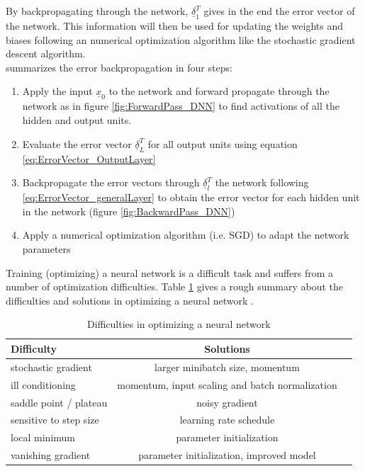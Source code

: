 \documentclass[12pt,DIV14,BCOR12mm,a4paper,footexclude,headinclude,halfparskip-,twoside,openright,cleardoubleempty,idxtotoc,bibtotoc,listtotoc]{scrreprt} %
\numberwithin{equation}{chapter}
\begin{document}
By backpropagating through the network, $\underline{\delta}_{1}^{T}$ gives in the end the error vector of the network. This information will then be used for updating the weights and biases following an numerical optimization algorithm like the stochastic gradient descent algorithm.\\
\cite{Bishop} summarizes the error backpropagation in four steps:
\begin{enumerate}
	\item Apply the input $\underline{x}_{0}$ to the network and forward propagate through the network as in figure \ref{fig:ForwardPass_DNN} to find activations of all the hidden and output units.
	\item Evaluate the error vector $\underline{\delta}_{L}^{T}$ for all output units using equation \ref{eq:ErrorVector_OutputLayer}
	\item Backpropagate the error vectors through $\underline{\delta}_{l}^{T}$ the network following \ref{eq:ErrorVector_generalLayer} to obtain the error vector for each hidden unit in the network (figure \ref{fig:BackwardPass_DNN})
	\item Apply a numerical optimization algorithm (i.e. SGD) to adapt the network parameters
\end{enumerate}
Training (optimizing) a neural network is a difficult task and suffers from a number of optimization difficulties. Table \ref{tab:Difficulties} gives a rough summary about the difficulties and solutions in optimizing a neural network \cite{LectureNotes_DeepLearning}.\\
\begin{table}
    \centering
    \caption{Difficulties in optimizing a neural network}
    \label{tab:Difficulties}
    \begin{tabular}{lcc}
        \toprule
        Difficulty & Solutions\\
        \midrule
        stochastic gradient & larger minibatch size, momentum\\
        ill conditioning & momentum, input scaling and batch normalization\\
        saddle point / plateau & noisy gradient\\
        sensitive to step size & learning rate schedule\\
        local minimum & parameter initialization\\
        vanishing gradient & parameter initialization, improved model\\
        \bottomrule
    \end{tabular}
\end{table}
\end{document}

